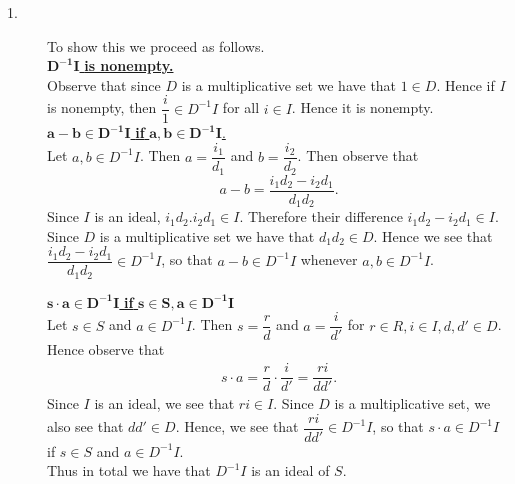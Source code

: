 \documentclass[12pt,letterpaper]{algebra_book}
\theoremstyle{definition}
\begin{document}
    \begin{prf}
        \begin{description}
            \item[1.] To show this we proceed as follows. \\
            \underline{$\bm{D^{-1}I} $ \textbf{is nonempty.}}\\[1.2ex]
            Observe that since $D$ is a multiplicative set we have that $1
            \in D$. Hence if $I$ is nonempty, then $\dfrac{i}{1} \in
            D^{-1}I$ for all $i \in I$. Hence it is nonempty.
            \\
    
            \noindent\underline{$\bm{a - b \in D^{-1}I}$ \textbf{if} $\bm{a, b
            \in D^{-1}I}$.}\\[1.2ex]
            Let $a, b \in D^{-1}I$. Then $a = \dfrac{i_1}{d_1}$ and $b =
            \dfrac{i_2}{d_2}$. Then observe that 
            \[
                a - b = \dfrac{i_1d_2 - i_2d_1}{d_1d_2}.
            \]
            Since $I$ is an ideal, $i_1d_2. i_2d_1 \in I$. Therefore their
            difference $i_1d_2 - i_2d_1 \in I$. Since $D$ is a
            multiplicative set we have that $d_1d_2 \in D$. Hence we see
            that $\dfrac{i_1d_2 - i_2d_1}{d_1d_2} \in D^{-1}I$, so that $a
            - b \in D^{-1}I$ whenever $a, b \in D^{-1}I$. 
    
            \noindent\underline{$\bm{s\cdot a\in D^{-1}I}$ \textbf{if} $\bm{s
            \in S, a \in D^{-1}I}$}\\[1.2ex]
            Let $s \in S$ and $a \in D^{-1}I$. Then $s = \dfrac{r}{d}$ and
            $a = \dfrac{i}{d'}$ for $r \in R, i \in I, d,d' \in D$. 
            Hence observe that 
            \begin{align*}
                s\cdot a = \dfrac{r}{d} \cdot \dfrac{i}{d'}
                = \dfrac{ri}{dd'}.
            \end{align*}
            Since $I$ is an ideal, we see that $ri \in I$. Since $D$ is a
            multiplicative set, we also see that $dd' \in D$. Hence, we
            see that $\dfrac{ri}{dd'} \in D^{-1}I$, so that $s\cdot a \in
            D^{-1}I$ if $s \in S$ and $a \in D^{-1}I$.\\
        Thus in total we have that $D^{-1}I$ is an ideal of $S$.
    

\end{description}
\end{prf}
\end{document}
